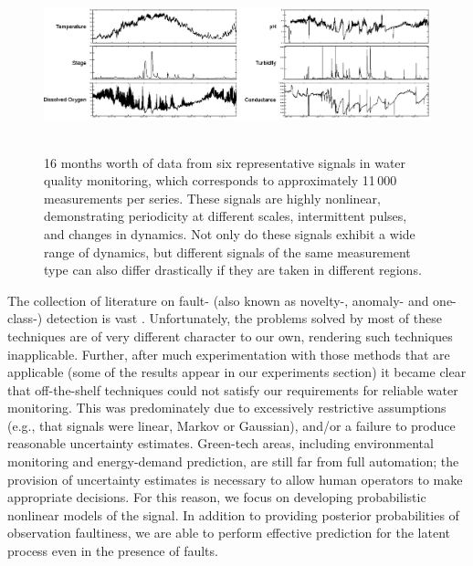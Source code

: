 \documentclass{article}
\begin{document}
\begin{figure}[t!]
\begin{center}
 \includegraphics[width=\textwidth, height=5cm]{watermonitoring.eps}
\end{center}
\caption{16 months worth of data from six representative
signals in water quality monitoring,
which corresponds to approximately 11\,000 measurements per series.
These signals are highly nonlinear, demonstrating periodicity at
different scales,
intermittent pulses, and changes in dynamics. Not only do these
signals exhibit a wide range of dynamics,
but different signals of the same measurement type can also differ
drastically if they are taken in different regions.
}
\label{fig:monitoring}
\end{figure}


The collection of literature on fault- (also known as novelty-, anomaly-
and one-class-) detection is vast
\cite{Eciolaza2001, deFreitas1996,
 Isermann2005, Ding2008,Markou2003,Chandola:2009,Khan2010,Dereszynski}.
Unfortunately, the problems solved by most of these techniques are of
very different character to our own, rendering such techniques
inapplicable. Further, after
much experimentation with those methods that are applicable (some of the results
appear in our experiments section) it became clear that off-the-shelf
techniques could not satisfy our requirements for reliable water
monitoring. This was predominately due to excessively restrictive assumptions
(e.g., that signals were linear, Markov or Gaussian), and/or a failure to
produce reasonable uncertainty
estimates. Green-tech areas, including environmental monitoring and
energy-demand prediction, are still far from full
automation; the provision of uncertainty estimates is necessary to
allow human operators to make appropriate decisions. For this reason,
we focus on developing probabilistic nonlinear models of the signal. In
addition to
providing posterior probabilities of observation faultiness, we are
able to perform effective prediction for the latent process even in
the presence of faults.
\end{document}

